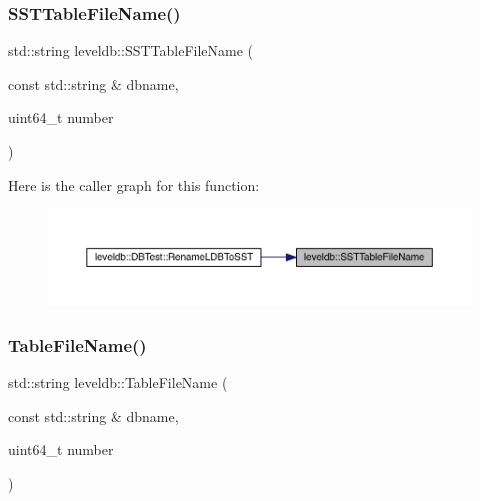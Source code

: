 \subsubsection{\texorpdfstring{SSTTableFileName()}{SSTTableFileName()}}
{\footnotesize\ttfamily std\+::string leveldb\+::\+S\+S\+T\+Table\+File\+Name (\begin{DoxyParamCaption}\item[{const std\+::string \&}]{dbname,  }\item[{uint64\+\_\+t}]{number }\end{DoxyParamCaption})}

Here is the caller graph for this function\+:
\nopagebreak
\begin{figure}[H]
\begin{center}
\leavevmode
\includegraphics[width=350pt]{namespaceleveldb_a576acf7326a43527670f08edd3e3e12b_icgraph}
\end{center}
\end{figure}
\mbox{\label{namespaceleveldb_a0d893a7fbbbc4a94ec75af4f6be33dbb}} 
\subsubsection{\texorpdfstring{TableFileName()}{TableFileName()}}
{\footnotesize\ttfamily std\+::string leveldb\+::\+Table\+File\+Name (\begin{DoxyParamCaption}\item[{const std\+::string \&}]{dbname,  }\item[{uint64\+\_\+t}]{number }\end{DoxyParamCaption})}

